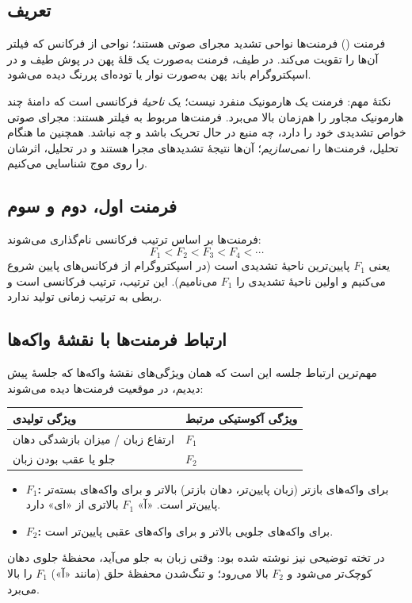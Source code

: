 \subsection{تعریف}
\begin{definitionbox}{فرمنت ()}
فرمنت‌ها نواحی تشدید مجرای صوتی هستند؛ نواحی از فرکانس که فیلتر آن‌ها را تقویت می‌کند. در طیف، فرمنت به‌صورت یک قلهٔ پهن در پوش طیف و در اسپکتروگرام باند پهن به‌صورت نوار یا توده‌ای پررنگ دیده می‌شود.
\end{definitionbox}

نکتهٔ مهم: فرمنت یک هارمونیک منفرد نیست؛ یک \emph{ناحیهٔ} فرکانسی است که دامنهٔ چند هارمونیک مجاور را هم‌زمان بالا می‌برد. فرمنت‌ها مربوط به فیلتر هستند: مجرای صوتی خواص تشدیدی خود را دارد، چه منبع در حال تحریک باشد و چه نباشد. همچنین ما هنگام تحلیل، فرمنت‌ها را \emph{نمی‌سازیم}؛ آن‌ها نتیجهٔ تشدیدهای مجرا هستند و در تحلیل، اثرشان را روی موج شناسایی می‌کنیم.

\subsection{فرمنت اول، دوم و سوم}
فرمنت‌ها بر اساس ترتیب فرکانسی نام‌گذاری می‌شوند:
\[
F_1<F_2<F_3<F_4<\cdots
\]
یعنی $F_1$ پایین‌ترین ناحیهٔ تشدیدی است (در اسپکتروگرام از فرکانس‌های پایین شروع می‌کنیم و اولین ناحیهٔ تشدیدی را $F_1$ می‌نامیم). این ترتیب، ترتیب فرکانسی است و ربطی به ترتیب زمانی تولید ندارد.

\subsection{ارتباط فرمنت‌ها با نقشهٔ واکه‌ها}
مهم‌ترین ارتباط جلسه این است که همان ویژگی‌های نقشهٔ واکه‌ها که جلسهٔ پیش دیدیم، در موقعیت فرمنت‌ها دیده می‌شوند:

\begin{center}
\begin{tabular}{ll}
\toprule
ویژگی تولیدی & ویژگی آکوستیکی مرتبط \\
\midrule
ارتفاع زبان / میزان بازشدگی دهان & $F_1$ \\
جلو یا عقب بودن زبان & $F_2$ \\
\bottomrule
\end{tabular}
\end{center}

\begin{itemize}
  \item \textbf{$F_1$:} برای واکه‌های بازتر (زبان پایین‌تر، دهان بازتر) بالاتر و برای واکه‌های بسته‌تر پایین‌تر است. «آ» $F_1$ بالاتری از «ای» دارد.
  \item \textbf{$F_2$:} برای واکه‌های جلویی بالاتر و برای واکه‌های عقبی پایین‌تر است.
\end{itemize}
در تخته توضیحی نیز نوشته شده بود: وقتی زبان به جلو می‌آید، محفظهٔ جلوی دهان کوچک‌تر می‌شود و $F_2$ بالا می‌رود؛ و تنگ‌شدن محفظهٔ حلق (مانند «آ») $F_1$ را بالا می‌برد.

